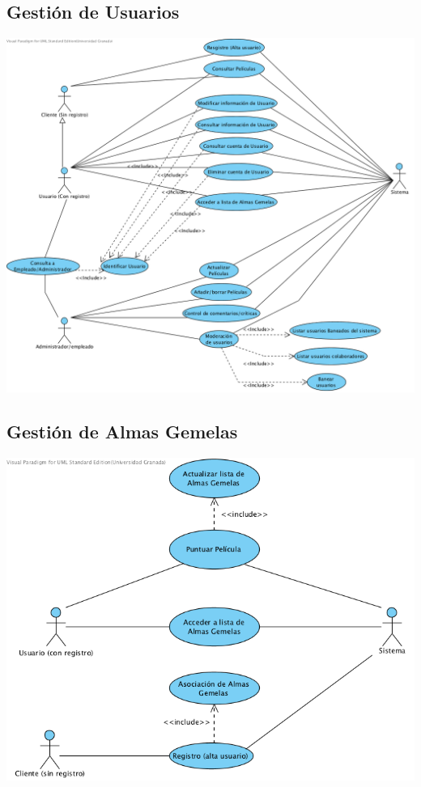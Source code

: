 \documentclass{article}
\begin{document}
\subsection*{Gestión de Usuarios}
		\begin{center}
   			\includegraphics[scale=0.65]{GestiondeUsuarios.png}
   		\end{center}	
   		
\subsection*{Gestión de Almas Gemelas}
		\begin{center}
   			\includegraphics[scale=0.65]{GestiondeAlmasGemelas.png}
   		\end{center}	
\end{document}
